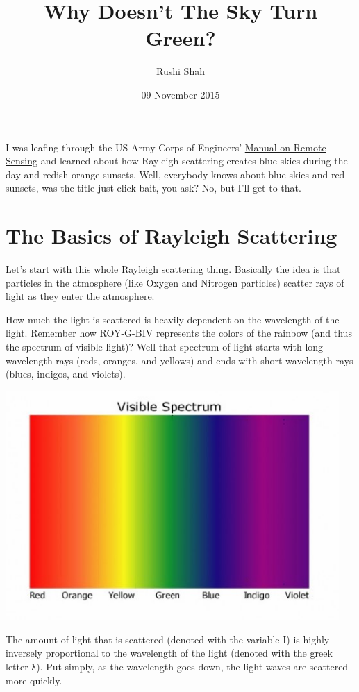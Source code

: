 \documentclass[12pt]{article}
\title{Why Doesn't The Sky Turn Green?}
\author{Rushi Shah}
\date{09 November 2015}
\begin{document}
  \maketitle

I was leafing through the US Army Corps of Engineers'
\href{\%7B\%7B\%20site.url\%20\%7D\%7Dblog/resources/Remote-Sensing-Army-Manual.pdf}{Manual
on Remote Sensing} and learned about how Rayleigh scattering creates
blue skies during the day and redish-orange sunsets. Well, everybody
knows about blue skies and red sunsets, was the title just click-bait,
you ask? No, but I'll get to that.

\section{The Basics of Rayleigh
Scattering}\label{the-basics-of-rayleigh-scattering}

Let's start with this whole Rayleigh scattering thing. Basically the
idea is that particles in the atmosphere (like Oxygen and Nitrogen
particles) scatter rays of light as they enter the atmosphere.

How much the light is scattered is heavily dependent on the wavelength
of the light. Remember how ROY-G-BIV represents the colors of the
rainbow (and thus the spectrum of visible light)? Well that spectrum of
light starts with long wavelength rays (reds, oranges, and yellows) and
ends with short wavelength rays (blues, indigos, and violets).

\begin{center}
\includegraphics[width=5in]{spectrum}
\end{center}

The amount of light that is scattered (denoted with the variable I) is
highly inversely proportional to the wavelength of the light (denoted
with the greek letter λ). Put simply, as the wavelength goes down, the
light waves are scattered more quickly.
\end{document}
